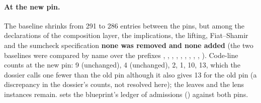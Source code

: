 \paragraph{At the new pin.} The baseline shrinks from 291 to 286 entries between the pins, but
among the declarations of the composition layer, the implications, the lifting, Fiat--Shamir and
the sumcheck specification \textbf{none was removed and none added} (the two baselines were
compared by name over the prefixes , , ,
, , , ,
, , ). Code-line 
counts at the new pin: \allowbreak{} 9 (unchanged), \allowbreak{}
4 (unchanged),  2, \allowbreak{} 1,
\allowbreak{} 10, \allowbreak{}\allowbreak{} 13, which the dossier
calls one fewer than the old pin although it also gives 13 for the old pin (a discrepancy in the
dossier's counts, not resolved here); the leaves \allowbreak{} and the lens
instances remain.  sets the blueprint's ledger of admissions
() against both pins.

